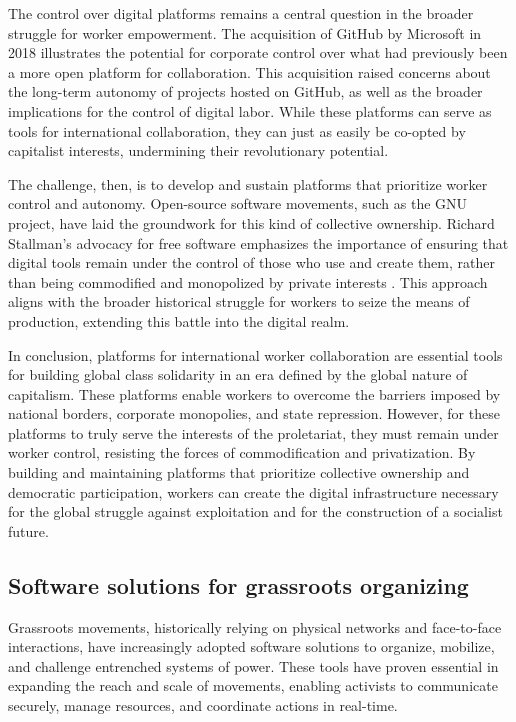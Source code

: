 \begin{refsection}
The control over digital platforms remains a central question in the broader struggle for worker empowerment. The acquisition of GitHub by Microsoft in 2018 illustrates the potential for corporate control over what had previously been a more open platform for collaboration. This acquisition raised concerns about the long-term autonomy of projects hosted on GitHub, as well as the broader implications for the control of digital labor. While these platforms can serve as tools for international collaboration, they can just as easily be co-opted by capitalist interests, undermining their revolutionary potential. 

The challenge, then, is to develop and sustain platforms that prioritize worker control and autonomy. Open-source software movements, such as the GNU project, have laid the groundwork for this kind of collective ownership. Richard Stallman’s advocacy for free software emphasizes the importance of ensuring that digital tools remain under the control of those who use and create them, rather than being commodified and monopolized by private interests \cite[pp.~45]{stallmanfreesoftware}. This approach aligns with the broader historical struggle for workers to seize the means of production, extending this battle into the digital realm.

In conclusion, platforms for international worker collaboration are essential tools for building global class solidarity in an era defined by the global nature of capitalism. These platforms enable workers to overcome the barriers imposed by national borders, corporate monopolies, and state repression. However, for these platforms to truly serve the interests of the proletariat, they must remain under worker control, resisting the forces of commodification and privatization. By building and maintaining platforms that prioritize collective ownership and democratic participation, workers can create the digital infrastructure necessary for the global struggle against exploitation and for the construction of a socialist future.

\subsection{Software solutions for grassroots organizing}

Grassroots movements, historically relying on physical networks and face-to-face interactions, have increasingly adopted software solutions to organize, mobilize, and challenge entrenched systems of power. These tools have proven essential in expanding the reach and scale of movements, enabling activists to communicate securely, manage resources, and coordinate actions in real-time.


\end{refsection}
